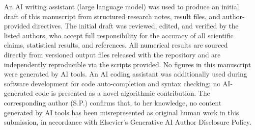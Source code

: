 \documentclass[a4paper,fleqn]{cas-sc}
\begin{document}
An AI writing assistant (large language model) was used to produce an initial
draft of this manuscript from structured research notes, result files, and
author-provided directives.
The initial draft was reviewed, edited, and verified by the listed authors,
who accept full responsibility for the accuracy of all scientific claims,
statistical results, and references.
All numerical results are sourced directly from versioned output files released
with the repository and are independently reproducible via the scripts provided.
No figures in this manuscript were generated by AI tools.
An AI coding assistant was additionally used during software development for
code auto-completion and syntax checking; no AI-generated code is presented as
a novel algorithmic contribution.
The corresponding author (S.P.) confirms that, to her knowledge, no content
generated by AI tools has been misrepresented as original human work in this
submission, in accordance with Elsevier's Generative AI Author Disclosure Policy.



\end{document}
